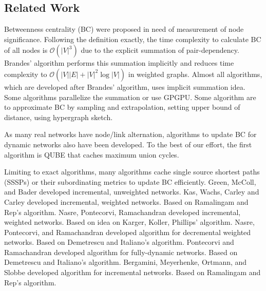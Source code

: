 \documentclass{article}
\begin{document}
\begin{multicols*}{2}
  \section{Related Work}
  Betweenness centrality (BC) were proposed in need of measurement of node significance\cite{Freeman1977}.
  Following the definition exactly, the time complexity to calculate BC of all nodes is $\mathcal{O}(\lvert V\rvert^3)$ due to the explicit summation of pair-dependency.
  Brandes' algorithm\cite{Brandes2001} performs this summation implicitly and reduces time complexity to $\mathcal{O}(\lvert V\rvert\lvert E\rvert+\lvert V\rvert^2\log\lvert V\rvert)$ in weighted graphs.
  Almost all algorithms, which are developed after Brandes' algorithm, uses implicit summation idea. Some algorithms parallelize the summation\cite{Bader2006,Tan2009,Edmonds2010} or use GPGPU\cite{Shi2011,Sariyuce2013,Bernaschi2016}. Some algorithm are to approximate BC by sampling and extrapolation\cite{Brandes2007,Bader2007,Geisberger2008,Chehreghani2014,Riondato2014,Riondato2016,Borassi2019}, setting upper bound of distance\cite{Pfeffer2012}, using hypergraph sketch\cite{Yoshida2014}.

  As many real networks have node/link alternation\cite{Holme2012}, algorithms to update BC for dynamic networks also have been developed.
  To the best of our effort, the first algorithm is QUBE\cite{Lee2012} that caches maximum union cycles.

  Limiting to exact algorithms, many algorithms cache single source shortest paths (SSSPs) or their subordinating metrics to update BC efficiently\cite{Green2012,Kas2013,Nasre2014a,Nasre2014b,Pontecorvi2015,Bergamini2017}.
  Green, McColl, and Bader\cite{Green2012} developed incremental, unweighted networks.
  Kas, Wachs, Carley and Carley\cite{Kas2013} developed incremental, weighted networks. Based on Ramalingam and Rep's algorithm\cite{Ramalingam1996}.
  Nasre, Pontecorvi, Ramachandran\cite{Nasre2014a} developed incremental, weighted networks. Based on idea on Karger, Koller, Phillips' algorithm\cite{Karger1993}.
  Nasre, Pontecorvi, and Ramachandran\cite{Nasre2014b} developed algorithm for decremental weighted networks. Based on Demetrescu and Italiano's algorithm\cite{Demetrescu2003}.
  Pontecorvi and Ramachandran\cite{Pontecorvi2014} developed algorithm for fully-dynamic networks. Based on Demetrescu and Italiano's algorithm.
  Bergamini, Meyerhenke, Ortmann, and Slobbe\cite{Bergamini2017} developed algorithm for incremental networks. Based on Ramalingam and Rep's algorithm.


\end{multicols*}
\end{document}

